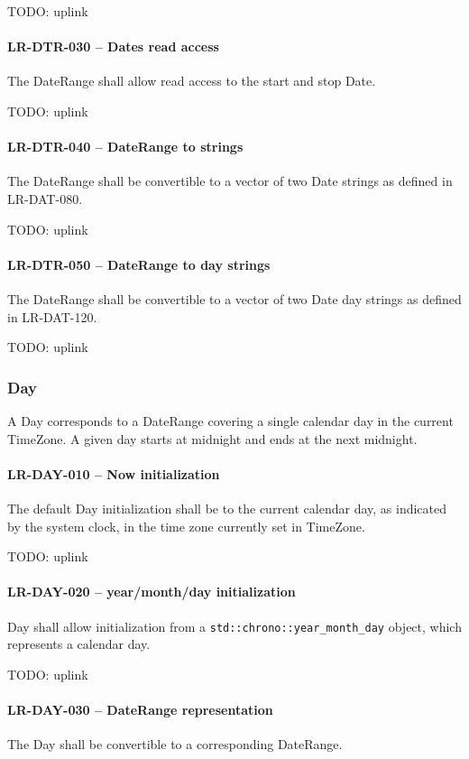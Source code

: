 TODO: uplink

\paragraph{LR-DTR-030 -- Dates read access}
The DateRange shall allow read access to the start and stop Date.

TODO: uplink
\paragraph{LR-DTR-040 -- DateRange to strings}
The DateRange shall be convertible to a vector of two Date strings
as defined in LR-DAT-080.

TODO: uplink
\paragraph{LR-DTR-050 -- DateRange to day strings}
The DateRange shall be convertible to a vector of two Date day strings
as defined in LR-DAT-120.

TODO: uplink

\subsubsection{Day}
A Day corresponds to a DateRange covering a single calendar day in
the current TimeZone. A given day starts at midnight and ends at the next
midnight.

\paragraph{LR-DAY-010 -- Now initialization}
The default Day initialization shall be to the current calendar day,
as indicated by the system clock, in the time zone currently set
in TimeZone.

TODO: uplink

\paragraph{LR-DAY-020 -- year/month/day initialization}
Day shall allow initialization from a \lstinline{std::chrono::year_month_day}
object, which represents a calendar day.

TODO: uplink

\paragraph{LR-DAY-030 -- DateRange representation}
The Day shall be convertible to a corresponding DateRange.


